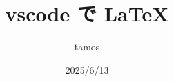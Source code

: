 \documentclass[a4paper,11pt]{jsarticle}
\begin{document}
\title{vscode で \LaTeX}
\author{tamos}
\date{2025/6/13}
\maketitle
\end{document}
